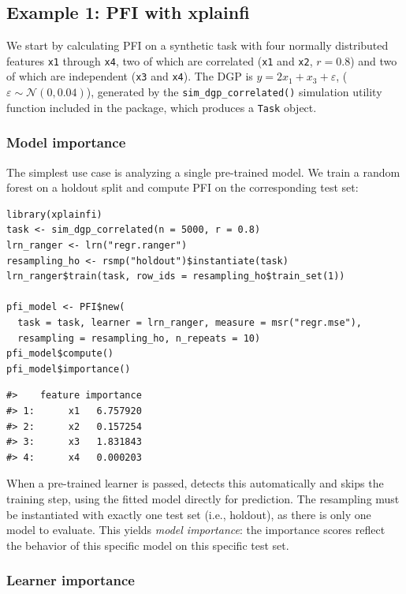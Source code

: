\subsection{Example 1: PFI with xplainfi}\label{example-1-pfi-with-xplainfi}

We start by calculating PFI on a synthetic task with four normally distributed features \texttt{x1} through \texttt{x4}, two of which are correlated (\texttt{x1} and \texttt{x2}, \(r = 0.8\)) and two of which are independent (\texttt{x3} and \texttt{x4}).
The DGP is \(y = 2 x_1 + x_3 + \varepsilon\), (\(\varepsilon \sim \mathcal{N}(0, 0.04)\)), generated by the \texttt{sim\_dgp\_correlated()} simulation utility function included in the package, which produces a \texttt{Task} object.

\subsubsection{Model importance}\label{model-importance}

The simplest use case is analyzing a single pre-trained model.
We train a  random forest on a holdout split and compute PFI on the corresponding test set:

\begin{verbatim}
library(xplainfi)
task <- sim_dgp_correlated(n = 5000, r = 0.8)
lrn_ranger <- lrn("regr.ranger")
resampling_ho <- rsmp("holdout")$instantiate(task)
lrn_ranger$train(task, row_ids = resampling_ho$train_set(1))

pfi_model <- PFI$new(
  task = task, learner = lrn_ranger, measure = msr("regr.mse"),
  resampling = resampling_ho, n_repeats = 10)
pfi_model$compute()
pfi_model$importance()
\end{verbatim}

\begin{verbatim}
#>    feature importance
#> 1:      x1   6.757920
#> 2:      x2   0.157254
#> 3:      x3   1.831843
#> 4:      x4   0.000203
\end{verbatim}

When a pre-trained learner is passed,  detects this automatically and skips the training step, using the fitted model directly for prediction.
The resampling must be instantiated with exactly one test set (i.e., holdout), as there is only one model to evaluate.
This yields \emph{model importance}: the importance scores reflect the behavior of this specific model on this specific test set.

\subsubsection{Learner importance}\label{learner-importance}


